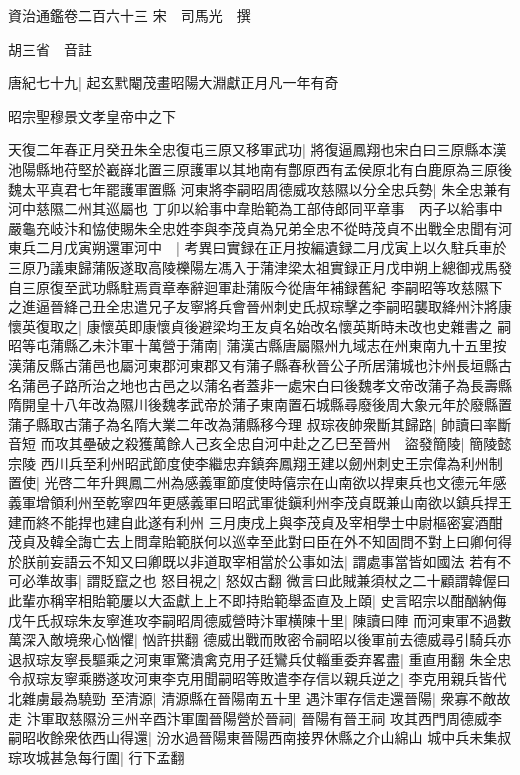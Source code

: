 資治通鑑卷二百六十三
宋　司馬光　撰

胡三省　音註

唐紀七十九|{
	起玄黓閹茂畫昭陽大淵獻正月凡一年有奇}


昭宗聖穆景文孝皇帝中之下

天復二年春正月癸丑朱全忠復屯三原又移軍武功|{
	將復逼鳳翔也宋白曰三原縣本漢池陽縣地苻堅於嶻嶭北置三原護軍以其地南有鄷原西有孟侯原北有白鹿原為三原後魏太平真君七年罷護軍置縣}
河東將李嗣昭周德威攻慈隰以分全忠兵勢|{
	朱全忠兼有河中慈隰二州其巡屬也}
丁卯以給事中韋貽範為工部侍郎同平章事　丙子以給事中嚴龜充岐汴和恊使賜朱全忠姓李與李茂貞為兄弟全忠不從時茂貞不出戰全忠聞有河東兵二月戊寅朔還軍河中　|{
	考異曰實録在正月按編遺録二月戊寅上以久駐兵車於三原乃議東歸蒲阪遂取高陵櫟陽左馮入于蒲津梁太祖實録正月戊申朔上總御戎馬發自三原復至武功縣駐焉貢章奉辭迴軍赴蒲阪今從唐年補録舊紀}
李嗣昭等攻慈隰下之進逼晉絳己丑全忠遣兄子友寧將兵會晉州刺史氏叔琮擊之李嗣昭襲取絳州汴將康懷英復取之|{
	康懷英即康懷貞後避梁均王友貞名始改名懷英斯時未改也史雜書之}
嗣昭等屯蒲縣乙未汴軍十萬營于蒲南|{
	蒲漢古縣唐屬隰州九域志在州東南九十五里按漢蒲反縣古蒲邑也屬河東郡河東郡又有蒲子縣春秋晉公子所居蒲城也汴州長垣縣古名蒲邑子路所治之地也古邑之以蒲名者蓋非一處宋白曰後魏孝文帝改蒲子為長壽縣隋開皇十八年改為隰川後魏孝武帝於蒲子東南置石城縣尋廢後周大象元年於廢縣置蒲子縣取古蒲子為名隋大業二年改為蒲縣移今理}
叔琮夜帥衆斷其歸路|{
	帥讀曰率斷音短}
而攻其壘破之殺獲萬餘人己亥全忠自河中赴之乙巳至晉州　盜發簡陵|{
	簡陵懿宗陵}
西川兵至利州昭武節度使李繼忠弃鎮奔鳳翔王建以劒州刺史王宗偉為利州制置使|{
	光啓二年升興鳳二州為感義軍節度使時僖宗在山南欲以捍東兵也文德元年感義軍增領利州至乾寧四年更感義軍曰昭武軍徙鎭利州李茂貞既兼山南欲以鎮兵捍王建而終不能捍也建自此遂有利州}
三月庚戌上與李茂貞及宰相學士中尉樞密宴酒酣茂貞及韓全誨亡去上問韋貽範朕何以巡幸至此對曰臣在外不知固問不對上曰卿何得於朕前妄語云不知又曰卿既以非道取宰相當於公事如法|{
	謂處事當皆如國法}
若有不可必準故事|{
	謂貶竄之也}
怒目視之|{
	怒奴古翻}
微言曰此賊兼須杖之二十顧謂韓偓曰此輩亦稱宰相貽範屢以大盃獻上上不即持貽範舉盃直及上頤|{
	史言昭宗以酣酗納侮}
戊午氏叔琮朱友寧進攻李嗣昭周德威營時汴軍横陳十里|{
	陳讀曰陣}
而河東軍不過數萬深入敵境衆心忷懼|{
	忷許拱翻}
德威出戰而敗密令嗣昭以後軍前去德威尋引騎兵亦退叔琮友寧長驅乘之河東軍驚潰禽克用子廷鸞兵仗輜重委弃畧盡|{
	重直用翻}
朱全忠令叔琮友寧乘勝遂攻河東李克用聞嗣昭等敗遣李存信以親兵逆之|{
	李克用親兵皆代北雜虜最為驍勁}
至清源|{
	清源縣在晉陽南五十里}
遇汴軍存信走還晉陽|{
	衆寡不敵故走}
汴軍取慈隰汾三州辛酉汴軍圍晉陽營於晉祠|{
	晉陽有晉王祠}
攻其西門周德威李嗣昭收餘衆依西山得還|{
	汾水過晉陽東晉陽西南接界休縣之介山綿山}
城中兵未集叔琮攻城甚急每行圍|{
	行下孟翻}
